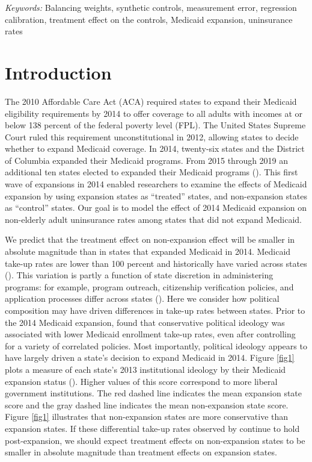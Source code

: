 \documentclass[12pt]{article}
\def\spacingset#1{\renewcommand{\baselinestretch}%
{#1}\small\normalsize} \spacingset{1}
\begin{document}
\noindent%
{\it Keywords:} Balancing weights, synthetic controls, measurement error, regression calibration, treatment effect on the controls, Medicaid expansion, uninsurance rates
\vfill

\newpage
\spacingset{1.45} %

\maketitle

\section{Introduction}

The 2010 Affordable Care Act (ACA) required states to expand their Medicaid eligibility requirements by 2014 to offer coverage to all adults with incomes at or below 138 percent of the federal poverty level (FPL). The United States Supreme Court ruled this requirement unconstitutional in 2012, allowing states to decide whether to expand Medicaid coverage. In 2014, twenty-six states and the District of Columbia expanded their Medicaid programs. From 2015 through 2019 an additional ten states elected to expanded their Medicaid programs (\cite{KFF}). This first wave of expansions in 2014 enabled researchers to examine the effects of Medicaid expansion by using expansion states as ``treated'' states, and non-expansion states as ``control'' states. Our goal is to model the effect of 2014 Medicaid expansion on non-elderly adult uninsurance rates among states that did not expand Medicaid.

We predict that the treatment effect on non-expansion effect will be smaller in absolute magnitude than in states that expanded Medicaid in 2014. Medicaid take-up rates are lower than 100 percent and historically have varied across states (\cite{sommers2012understanding}). This variation is partly a function of state discretion in administering programs: for example, program outreach, citizenship verification policies, and application processes differ across states (\cite{courtemanche2017early}). Here we consider how political composition may have driven differences in take-up rates between states. Prior to the 2014 Medicaid expansion, \cite{sommers2012understanding} found that conservative political ideology was associated with lower Medicaid enrollment take-up rates, even after controlling for a variety of correlated policies. Most importantly, political ideology appears to have largely driven a state's decision to expand Medicaid in 2014. Figure \ref{fig1} plots a measure of each state's 2013 institutional ideology by their Medicaid expansion status (\cite{fording}). Higher values of this score correspond to more liberal government institutions. The red dashed line indicates the mean expansion state score and the gray dashed line indicates the mean non-expansion state score. Figure \ref{fig1} illustrates that non-expansion states are more conservative than expansion states.  If these differential take-up rates observed by \cite{sommers2012understanding} continue to hold post-expansion, we should expect treatment effects on non-expansion states to be smaller in absolute magnitude than treatment effects on expansion states. 
\end{document}
